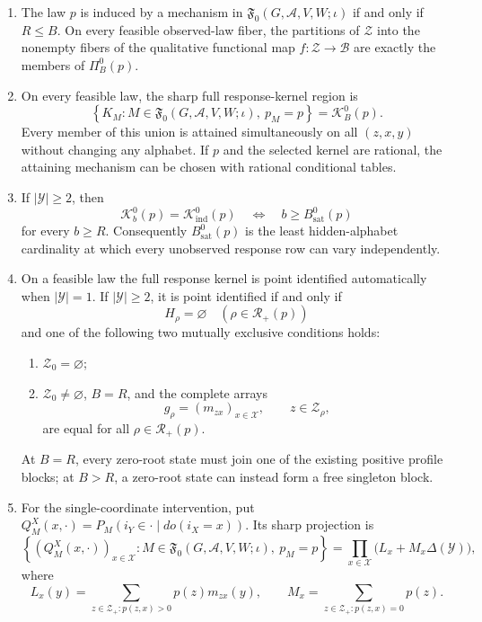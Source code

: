 \begin{enumerate}
\item The law \(p\) is induced by a mechanism in
\(\mathfrak F_0(G,\mathcal A,V,W;\iota)\) if and only if \(R\leq B\).
On every feasible observed-law fiber, the partitions of \(\mathcal Z\)
into the nonempty fibers of the qualitative functional map
\(f:\mathcal Z\to\mathcal B\) are exactly the members of
\(\Pi_B^0(p)\).
\item On every feasible law, the sharp full response-kernel region is
\[
 \left\{K_M:M\in\mathfrak F_0(G,\mathcal A,V,W;\iota),\ p_M=p\right\}
 =\mathcal K_B^0(p).
\]
Every member of this union is attained simultaneously on all
\((z,x,y)\) without changing any alphabet.  If \(p\) and the selected
kernel are rational, the attaining mechanism can be chosen with rational
conditional tables.
\item If \(\lvert\mathcal Y\rvert\geq2\), then
\[
 \mathcal K_b^0(p)=\mathcal K_{\mathrm{ind}}^0(p)
 \quad\Longleftrightarrow\quad
 b\geq B_{\mathrm{sat}}^0(p)
\]
for every \(b\geq R\).  Consequently
\(B_{\mathrm{sat}}^0(p)\) is the least hidden-alphabet cardinality at
which every unobserved response row can vary independently.
\item On a feasible law the full response kernel is point identified
automatically when \(\lvert\mathcal Y\rvert=1\).  If
\(\lvert\mathcal Y\rvert\geq2\), it is point identified if and only if
\[
 H_\rho=\varnothing\quad(\rho\in\mathcal R_+(p))
\]
and one of the following two mutually exclusive conditions holds:
\begin{enumerate}
\item \(\mathcal Z_0=\varnothing\);
\item \(\mathcal Z_0\ne\varnothing\), \(B=R\), and the complete arrays
\[
 g_\rho=(m_{zx})_{x\in\mathcal X},\qquad z\in\mathcal Z_\rho,
\]
are equal for all \(\rho\in\mathcal R_+(p)\).
\end{enumerate}
At \(B=R\), every zero-root state must join one of the existing positive
profile blocks; at \(B>R\), a zero-root state can instead form a free
singleton block.
\item For the single-coordinate intervention, put
\(Q_M^X(x,\cdot)=P_M(i_Y\in\cdot\mid do(i_X=x))\).  Its sharp projection
is
\[
 \left\{(Q_M^X(x,\cdot))_{x\in\mathcal X}:
 M\in\mathfrak F_0(G,\mathcal A,V,W;\iota),\ p_M=p\right\}
 =\prod_{x\in\mathcal X}\bigl(L_x+M_x\Delta(\mathcal Y)\bigr),
\]
where
\[
 L_x(y)=\sum_{z\in\mathcal Z_+:p(z,x)>0}p(z)m_{zx}(y),
 \qquad
 M_x=\sum_{z\in\mathcal Z_+:p(z,x)=0}p(z).
\]
\end{enumerate}

